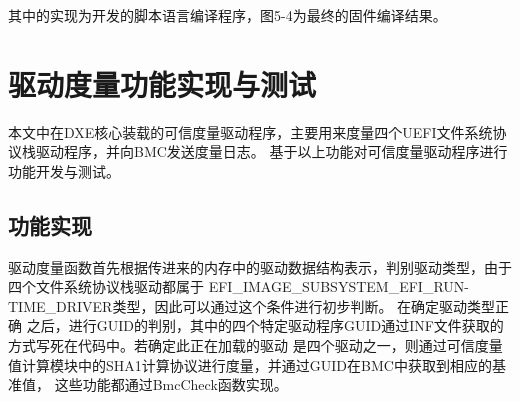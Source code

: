 其中的实现为开发的脚本语言编译程序，图5-4为最终的固件编译结果。



%
%
\section{驱动度量功能实现与测试}
本文中在DXE核心装载的可信度量驱动程序，主要用来度量四个UEFI文件系统协议栈驱动程序，并向BMC发送度量日志。
基于以上功能对可信度量驱动程序进行功能开发与测试。

\subsection{功能实现}
驱动度量函数首先根据传进来的内存中的驱动数据结构表示，判别驱动类型，由于四个文件系统协议栈驱动都属于
EFI\_IMAGE\_SUBSYSTEM\_EFI\_RUN-\newline TIME\_DRIVER类型\cite{addition3}，因此可以通过这个条件进行初步判断。
在确定驱动类型正确
之后，进行GUID的判别，其中的四个特定驱动程序GUID通过INF文件获取的方式写死在代码中。若确定此正在加载的驱动
是四个驱动之一，则通过可信度量值计算模块中的SHA1计算协议进行度量，并通过GUID在BMC中获取到相应的基准值，
这些功能都通过BmcCheck函数实现。

